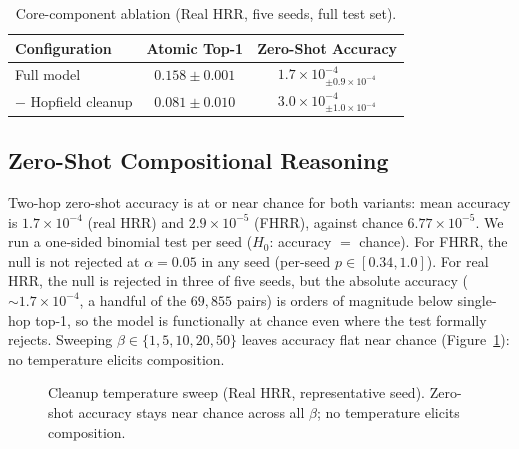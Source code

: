 \documentclass[11pt]{article}
\theoremstyle{definition}
\begin{document}
\begin{table}[H]
\centering
\caption{Core-component ablation (Real HRR, five seeds, full test set).}
\label{tab:ablation}
\begin{tabular}{lcc}
\toprule
Configuration & Atomic Top-1 & Zero-Shot Accuracy \\
\midrule
Full model            & $0.158 \pm 0.001$ & $1.7 \times 10^{-4}_{\pm 0.9 \times 10^{-4}}$ \\
$-$ Hopfield cleanup  & $0.081 \pm 0.010$ & $3.0 \times 10^{-4}_{\pm 1.0 \times 10^{-4}}$ \\
\bottomrule
\end{tabular}
\end{table}

\subsection{Zero-Shot Compositional Reasoning}
\label{sec:results-zeroshot}

Two-hop zero-shot accuracy is at or near chance for both variants: mean
accuracy is $1.7 \times 10^{-4}$ (real HRR) and $2.9 \times 10^{-5}$ (FHRR),
against chance $6.77 \times 10^{-5}$. We run a one-sided binomial test per
seed ($H_0$: accuracy $=$ chance). For FHRR, the null is not rejected at
$\alpha = 0.05$ in any seed (per-seed $p \in [0.34, 1.0]$). For real HRR,
the null is rejected in three of five seeds, but the absolute accuracy
($\sim 1.7 \times 10^{-4}$, a handful of the $69{,}855$ pairs) is orders of
magnitude below single-hop top-1, so the model is functionally at chance even
where the test formally rejects. Sweeping $\beta \in \{1,5,10,20,50\}$ leaves
accuracy flat near chance (Figure~\ref{fig:beta}): no temperature elicits
composition.

\begin{figure}[H]
\centering
{}
\caption{Cleanup temperature sweep (Real HRR, representative seed). Zero-shot
accuracy stays near chance across all $\beta$; no temperature elicits composition.}
\label{fig:beta}
\end{figure}
\end{document}
